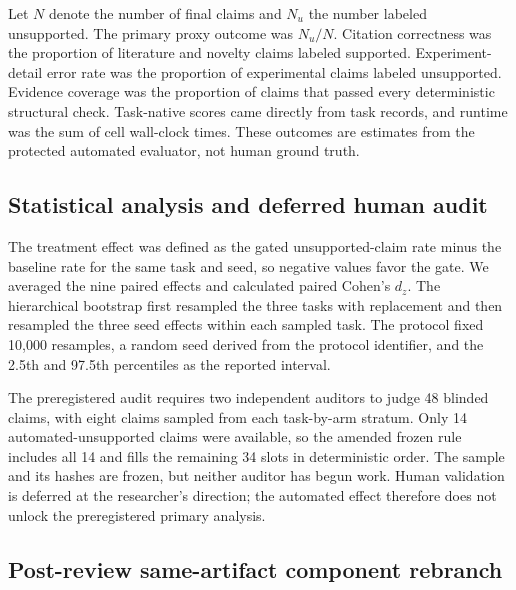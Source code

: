 \documentclass[11pt]{article}
\begin{document}
Let $N$ denote the number of final claims and $N_u$ the number labeled unsupported. The primary proxy outcome was $N_u/N$. Citation correctness was the proportion of literature and novelty claims labeled supported. Experiment-detail error rate was the proportion of experimental claims labeled unsupported. Evidence coverage was the proportion of claims that passed every deterministic structural check. Task-native scores came directly from task records, and runtime was the sum of cell wall-clock times. These outcomes are estimates from the protected automated evaluator, not human ground truth.

\subsection{Statistical analysis and deferred human audit}

The treatment effect was defined as the gated unsupported-claim rate minus the baseline rate for the same task and seed, so negative values favor the gate. We averaged the nine paired effects and calculated paired Cohen's $d_z$. The hierarchical bootstrap first resampled the three tasks with replacement and then resampled the three seed effects within each sampled task. The protocol fixed 10,000 resamples, a random seed derived from the protocol identifier, and the 2.5th and 97.5th percentiles as the reported interval.

The preregistered audit requires two independent auditors to judge 48 blinded claims, with eight claims sampled from each task-by-arm stratum. Only 14 automated-unsupported claims were available, so the amended frozen rule includes all 14 and fills the remaining 34 slots in deterministic order. The sample and its hashes are frozen, but neither auditor has begun work. Human validation is deferred at the researcher's direction; the automated effect therefore does not unlock the preregistered primary analysis.

\subsection{Post-review same-artifact component rebranch}
\end{document}
